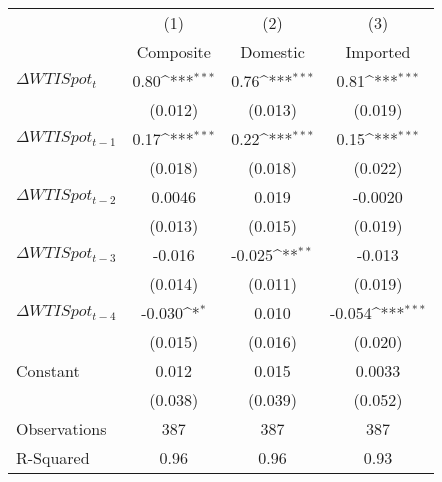 {
\def\sym#1{\ifmmode^{#1}\else\(^{#1}\)\fi}
\begin{tabular}{l*{3}{c}}
\toprule
                    &\multicolumn{1}{c}{(1)}&\multicolumn{1}{c}{(2)}&\multicolumn{1}{c}{(3)}\\
                    &\multicolumn{1}{c}{Composite}&\multicolumn{1}{c}{Domestic}&\multicolumn{1}{c}{Imported}\\
\midrule
$\Delta WTISpot_t$  &        0.80\sym{***}&        0.76\sym{***}&        0.81\sym{***}\\
                    &     (0.012)         &     (0.013)         &     (0.019)         \\
$\Delta WTISpot_{t-1}$&        0.17\sym{***}&        0.22\sym{***}&        0.15\sym{***}\\
                    &     (0.018)         &     (0.018)         &     (0.022)         \\
$\Delta WTISpot_{t-2}$&      0.0046         &       0.019         &     -0.0020         \\
                    &     (0.013)         &     (0.015)         &     (0.019)         \\
$\Delta WTISpot_{t-3}$&      -0.016         &      -0.025\sym{**} &      -0.013         \\
                    &     (0.014)         &     (0.011)         &     (0.019)         \\
$\Delta WTISpot_{t-4}$&      -0.030\sym{*}  &       0.010         &      -0.054\sym{***}\\
                    &     (0.015)         &     (0.016)         &     (0.020)         \\
Constant            &       0.012         &       0.015         &      0.0033         \\
                    &     (0.038)         &     (0.039)         &     (0.052)         \\
\midrule
Observations        &         387         &         387         &         387         \\
R-Squared           &        0.96         &        0.96         &        0.93         \\
\bottomrule
\end{tabular}
}
